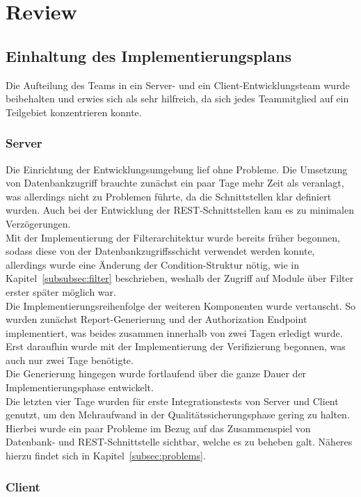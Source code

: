 \section{Review}
\subsection{Einhaltung des Implementierungsplans}
Die Aufteilung des Teams in ein Server- und ein Client-Entwicklungsteam wurde beibehalten und erwies sich als sehr hilfreich, da sich jedes Teammitglied auf ein Teilgebiet konzentrieren konnte.
\subsubsection{Server}
Die Einrichtung der Entwicklungsumgebung lief ohne Probleme. Die Umsetzung von Datenbankzugriff brauchte zunächst ein paar Tage mehr Zeit als veranlagt, was allerdings nicht zu Problemen führte, da die Schnittstellen klar definiert wurden. Auch bei der Entwicklung der REST-Schnittstellen kam es zu minimalen Verzögerungen.\\
 Mit der Implementierung der Filterarchitektur wurde bereits früher begonnen, sodass diese von der Datenbankzugriffsschicht verwendet werden konnte, allerdings wurde eine Änderung der Condition-Struktur nötig, wie in Kapitel~\ref{subsubsec:filter} beschrieben, weshalb der Zugriff auf Module über Filter erster später möglich war.\\
 Die Implementierungsreihenfolge der weiteren Komponenten wurde vertauscht. So wurden zunächst Report-Generierung und der Authorization Endpoint implementiert, was beides zusammen innerhalb von zwei Tagen erledigt wurde. Erst daraufhin wurde mit der Implementierung der Verifizierung begonnen, was auch nur zwei Tage benötigte. \\
 Die Generierung hingegen wurde fortlaufend über die ganze Dauer der Implementierungsphase entwickelt. \\
 Die letzten vier Tage wurden für erste Integrationstests von Server und Client genutzt, um den Mehraufwand in der Qualitätssicherungsphase gering zu halten. Hierbei wurde ein paar Probleme im Bezug auf das Zusammenspiel von Datenbank- und REST-Schnittstelle sichtbar, welche es zu beheben galt. Näheres hierzu findet sich in Kapitel~\ref{subsec:problems}.
 
 
 \subsubsection{Client}
 
 
